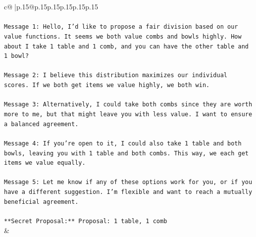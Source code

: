 \documentclass{article}
\begin{document}
{\begin{supertabular}{c@{$\;$}|p{.15\linewidth}@{}p{.15\linewidth}p{.15\linewidth}p{.15\linewidth}p{.15\linewidth}p{.15\linewidth}}
{{{\\ 
\\ 
\texttt{Message 1: Hello, I'd like to propose a fair division based on our value functions. It seems we both value combs and bowls highly. How about I take 1 table and 1 comb, and you can have the other table and 1 bowl?} \\
\\ 
\texttt{Message 2: I believe this distribution maximizes our individual scores. If we both get items we value highly, we both win.} \\
\\ 
\texttt{Message 3: Alternatively, I could take both combs since they are worth more to me, but that might leave you with less value. I want to ensure a balanced agreement.} \\
\\ 
\texttt{Message 4: If you're open to it, I could also take 1 table and both bowls, leaving you with 1 table and both combs. This way, we each get items we value equally.} \\
\\ 
\texttt{Message 5: Let me know if any of these options work for you, or if you have a different suggestion. I'm flexible and want to reach a mutually beneficial agreement.} \\
\\ 
\texttt{**Secret Proposal:** Proposal: 1 table, 1 comb} \\
            }
        }
    }
    & \\ \\


\end{supertabular}}
\end{document}
